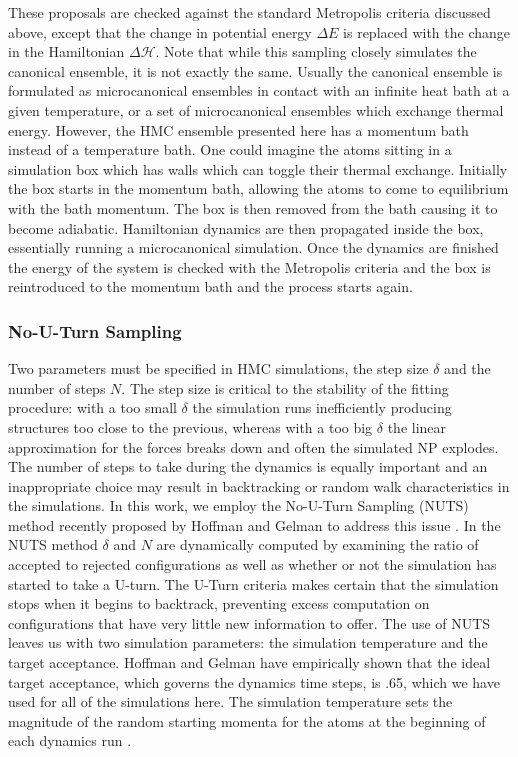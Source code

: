 These proposals are checked against the standard Metropolis criteria discussed above, except that the change in potential energy $\Delta E$ is replaced with the change in the Hamiltonian $\Delta \mathcal{H}$.
Note that while this sampling closely simulates the canonical ensemble, it is not exactly the same.
Usually the canonical ensemble is formulated as microcanonical ensembles in contact with an infinite heat bath at a given temperature, or a set of microcanonical ensembles which exchange thermal energy.
However, the HMC ensemble presented here has a momentum bath instead of a temperature bath.
One could imagine the atoms sitting in a simulation box which has walls which can toggle their thermal exchange.
Initially the box starts in the momentum bath, allowing the atoms to come to equilibrium with the bath momentum.
The box is then removed from the bath causing it to become adiabatic.
Hamiltonian dynamics are then propagated inside the box, essentially running a microcanonical simulation.
Once the dynamics are finished the energy of the system is checked with the Metropolis criteria and the box is reintroduced to the momentum bath and the process starts again.

\subsubsection{No-U-Turn Sampling}
Two parameters must be specified in HMC simulations, the step size $\delta$ and the number of steps $N$.
The step size is critical to the stability of the fitting procedure:  with a too small $\delta$ the simulation runs inefficiently producing structures too close to the previous, whereas with a too big $\delta$ the linear approximation for the forces breaks down and often the simulated NP explodes.
The number of steps to take during the dynamics is equally important and an inappropriate choice may result in backtracking or random walk characteristics in the simulations.
In this work, we employ the No-U-Turn Sampling (NUTS) method recently proposed by Hoffman and Gelman to address this issue \cite{Hoffman2014}.
In the NUTS method $\delta$ and $N$ are dynamically computed by examining the ratio of accepted to rejected configurations as well as whether or not the simulation has started to take a U-turn.
The U-Turn criteria makes certain that the simulation stops when it begins to backtrack, preventing excess computation on configurations that have very little new information to offer.
The use of NUTS leaves us with two simulation parameters: the simulation temperature and the target acceptance.
Hoffman and  Gelman have empirically shown that the ideal target acceptance, which governs the dynamics time steps, is .65, which we have used for all of the simulations here.
The simulation temperature sets the magnitude of the random starting momenta for the atoms at the beginning of each dynamics run \cite{Hoffman2014}.

